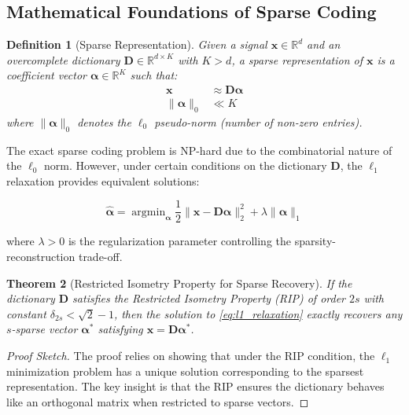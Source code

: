 \documentclass[12pt]{article}
\renewcommand{\vec}[1]{\mathbf{#1}}
\DeclareMathOperator{\argmin}{argmin}
\newcommand{\dictionary}{\mathbf{D}}
\newcommand{\coeff}{\boldsymbol{\alpha}}
\newtheorem{theorem}{Theorem}[section]
\newtheorem{definition}[theorem]{Definition}
\begin{document}
\subsection{Mathematical Foundations of Sparse Coding}
\label{subsec:sparse_foundations}

\begin{definition}[Sparse Representation]
    \label{def:sparse_representation}
    Given a signal $\vec{x} \in \mathbb{R}^d$ and an overcomplete dictionary $\dictionary \in \mathbb{R}^{d \times K}$ with $K > d$, a sparse representation of $\vec{x}$ is a coefficient vector $\coeff \in \mathbb{R}^K$ such that:
    \begin{align}
        \vec{x}      & \approx \dictionary \coeff \label{eq:sparse_approx} \\
        \|\coeff\|_0 & \ll K \label{eq:sparsity_constraint}
    \end{align}
    where $\|\coeff\|_0$ denotes the $\ell_0$ pseudo-norm (number of non-zero entries).
\end{definition}

The exact sparse coding problem is NP-hard due to the combinatorial nature of the $\ell_0$ norm. However, under certain conditions on the dictionary $\dictionary$, the $\ell_1$ relaxation provides equivalent solutions:

\begin{equation}
    \label{eq:l1_relaxation}
    \hat{\coeff} = \argmin_{\coeff} \frac{1}{2}\|\vec{x} - \dictionary\coeff\|_2^2 + \lambda\|\coeff\|_1
\end{equation}

where $\lambda > 0$ is the regularization parameter controlling the sparsity-reconstruction trade-off.

\begin{theorem}[Restricted Isometry Property for Sparse Recovery]
    \label{thm:rip}
    If the dictionary $\dictionary$ satisfies the Restricted Isometry Property (RIP) of order $2s$ with constant $\delta_{2s} < \sqrt{2} - 1$, then the solution to \eqref{eq:l1_relaxation} exactly recovers any $s$-sparse vector $\coeff^*$ satisfying $\vec{x} = \dictionary\coeff^*$.
\end{theorem}

\begin{proof}[Proof Sketch]
    The proof relies on showing that under the RIP condition, the $\ell_1$ minimization problem has a unique solution corresponding to the sparsest representation. The key insight is that the RIP ensures the dictionary behaves like an orthogonal matrix when restricted to sparse vectors.
\end{proof}
\end{document}
